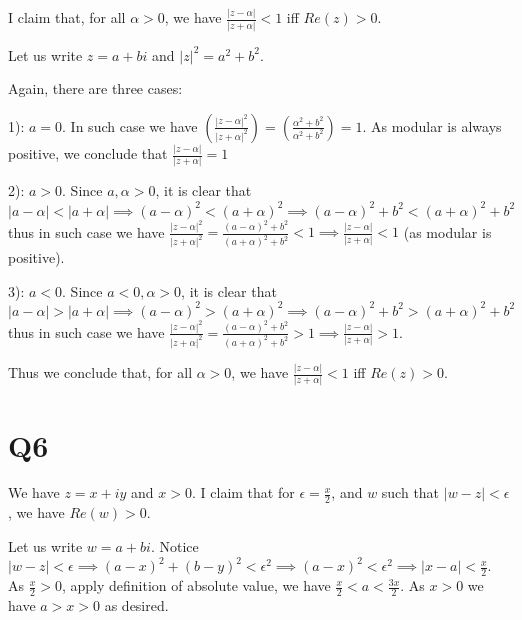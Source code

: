 \documentclass[12pt]{article}
\begin{document}
I claim that, for all $\alpha>0$, we have $\frac{|z-\alpha|}{|z+\alpha|} < 1$ iff $Re(z) > 0$.

Let us write $z = a+ bi$ and $|z|^2 = a^2 + b^2$.

Again, there are three cases:

1): $a=0$.
In such case we have $(\frac{|z-\alpha|^2}{|z+\alpha|^2}) = (\frac{\alpha^2 + b^2}{\alpha^2 + b^2}) = 1$. As modular is always positive, we conclude that $\frac{|z-\alpha|}{|z+\alpha|} = 1$

2): $a>0$. 
Since $a, \alpha>0$, it is clear that $|a-\alpha| < |a+\alpha| \implies (a-\alpha)^2 < (a+\alpha)^2 \implies (a-\alpha)^2 + b^2 < (a+\alpha)^2 + b^2$ thus
in such case we have $\frac{|z-\alpha|^2}{|z+\alpha|^2} = \frac{(a-\alpha)^2 + b^2}{(a+\alpha)^2 + b^2} < 1 \implies \frac{|z-\alpha|}{|z+\alpha|} < 1$ (as modular is positive). 

3): $a<0$.
Since $a<0, \alpha>0$, it is clear that $|a-\alpha| > |a+\alpha| \implies (a-\alpha)^2 > (a+\alpha)^2 \implies (a-\alpha)^2 + b^2 > (a+\alpha)^2 + b^2$ thus 
in such case we have $\frac{|z-\alpha|^2}{|z+\alpha|^2} = \frac{(a-\alpha)^2 + b^2}{(a+\alpha)^2 + b^2} > 1 \implies \frac{|z-\alpha|}{|z+\alpha|} > 1$.

Thus we conclude that, for all $\alpha>0$, we have $\frac{|z-\alpha|}{|z+\alpha|} < 1$ iff $Re(z) > 0$.

\section{Q6}
We have  $z = x+iy$ and $x>0$. I claim that for $\epsilon = \frac{x}{2}$, and $w $ such that $|w-z| < \epsilon$, we have $Re(w) > 0$.

Let us write $w = a+bi$. Notice $|w-z|<\epsilon \implies (a-x)^2 + (b-y)^2 < \epsilon^2 \implies (a-x)^2 < \epsilon^2 \implies |x-a| < \frac{x}{2} $. As $\frac{x}{2}>0$, apply definition of absolute value, we have $ \frac{x}{2}<a<\frac{3x}{2}$. As $x > 0$ we have $a>x>0$ as desired. 
\end{document}

